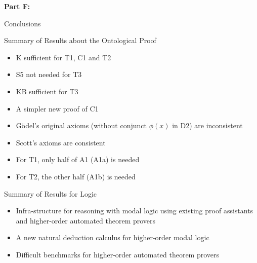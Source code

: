 
\begin{transitionframe}
\textbf{Part F:}

Conclusions
\end{transitionframe}



\begin{frame}{Summary of Results about the Ontological Proof}
\begin{itemize}[<+->]
\item K sufficient for T1, C1 and T2 
\item S5 not needed for T3
\item KB sufficient for T3 
\item A simpler new proof of C1
\item G\"odel's original axioms (without conjunct $\phi(x)$ in D2) are inconsistent
\item Scott's axioms are consistent
\item For T1, only half of A1 (A1a) is needed 
\item For T2, the other half (A1b) is needed
\end{itemize}
\end{frame}


\begin{frame}{Summary of Results for Logic} \small
\begin{itemize}[<+->]
\item Infra-structure for reasoning with modal logic using existing proof assistants and higher-order automated theorem provers
\item A new natural deduction calculus for higher-order modal logic
\item Difficult benchmarks for higher-order automated theorem provers
\end{itemize}
\end{frame}

